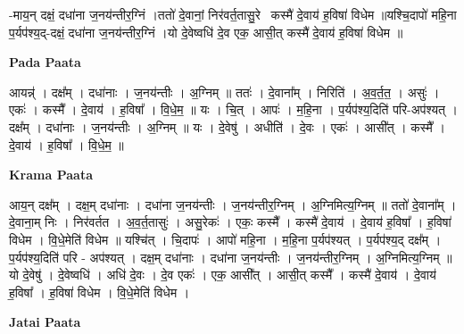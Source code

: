 \documentclass[17pt]{extarticle}
\begin{document}
-माय॒न् दक्षं॒ दधा॑ना ज॒नय॑न्तीर॒ग्निं ।ततो॑ दे॒वानां॒ निर॑वर्त॒तासु॒रेकः᳡कस्मै॑ दे॒वाय॑ ह॒विषा॑ विधेम ॥यश्चि॒दापो॑ महि॒ना प॒र्यप॑श्य॒द्-दक्षं॒ दधा॑ना ज॒नय॑न्तीर॒ग्निं ।यो दे॒वेष्वधि॑ दे॒व एक॒ आसी॒त् कस्मै॑ दे॒वाय॑ ह॒विषा॑ विधेम ॥ \newline

\textbf{Pada Paata} \newline

आयन्न्॑ । दक्ष᳚म् । दधा॑नाः । ज॒नय॑न्तीः । अ॒ग्निम् ॥ ततः॑ । दे॒वाना᳚म् । निरिति॑ । अ॒व॒र्त॒त॒ । असुः॑ । एकः॑ । कस्मै᳚ । दे॒वाय॑ । ह॒विषा᳚ । वि॒धे॒म॒ ॥ यः । चि॒त् । आपः॑ । म॒हि॒ना । प॒र्यप॑श्य॒दिति॑ परि-अप॑श्यत् । दक्ष᳚म् । दधा॑नाः । ज॒नय॑न्तीः । अ॒ग्निम् ॥ यः । दे॒वेषु॑ । अधीति॑ । दे॒वः । एकः॑ । आसी᳚त् । कस्मै᳚ । दे॒वाय॑ । ह॒विषा᳚ । वि॒धे॒म॒ ॥  \newline


\textbf{Krama Paata} \newline

आय॒न् दक्ष᳚म् । दक्ष॒म् दधा॑नाः । दधा॑ना ज॒नय॑न्तीः । ज॒नय॑न्तीर॒ग्निम् । अ॒ग्निमित्य॒ग्निम् ॥ ततो॑ दे॒वाना᳚म् । दे॒वाना॒म् निः । निर॑वर्तत । अ॒व॒र्त॒तासुः॑ । असु॒रेकः॑ । एकः॒ कस्मै᳚ । कस्मै॑ दे॒वाय॑ । दे॒वाय॑ ह॒विषा᳚ । ह॒विषा॑ विधेम । वि॒धे॒मेति॑ विधेम ॥ यश्चि॑त् । चि॒दापः॑ । आपो॑ महि॒ना । म॒हि॒ना प॒र्यप॑श्यत् । प॒र्यप॑श्य॒द् दक्ष᳚म् । प॒र्यप॑श्य॒दिति॑ परि - अप॑श्यत् । दक्ष॒म् दधा॑नाः । दधा॑ना ज॒नय॑न्तीः । ज॒नय॑न्तीर॒ग्निम् । अ॒ग्निमित्य॒ग्निम् ॥ यो दे॒वेषु॑ । दे॒वेष्वधि॑ । अधि॑ दे॒वः । दे॒व एकः॑ । एक॒ आसी᳚त् । आसी॒त् कस्मै᳚ । कस्मै॑ दे॒वाय॑ । दे॒वाय॑ ह॒विषा᳚ । ह॒विषा॑ विधेम । वि॒धे॒मेति॑ विधेम । \newline

\textbf{Jatai Paata} \newline
\end{document}

